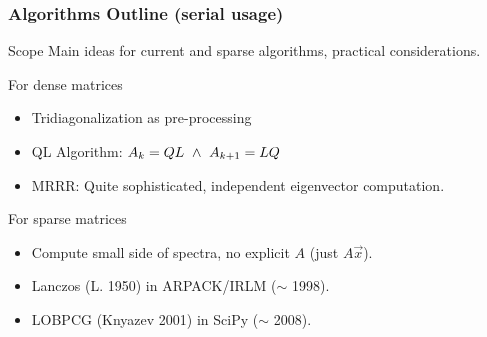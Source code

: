  \begin{frame}
  \frametitle{Algorithms Outline (serial usage)}
  \begin{block}{Scope}
    Main ideas for current and sparse algorithms, practical
    considerations. 
  \end{block}
  \begin{block}{For dense matrices}
    \begin{itemize}
      \item Tridiagonalization as pre-processing
      \item QL Algorithm: $A_k = QL \,\,\land\,\, A_{k+1} = L Q$
      \item MRRR: Quite sophisticated, independent eigenvector computation.
    \end{itemize}
  \end{block}
  \begin{block}{For sparse matrices}
    \begin{itemize}
      \item Compute small side of spectra, no explicit $A$ (just $A\vec{x}$).
    \item Lanczos (L. 1950) in ARPACK/IRLM ($\sim$ 1998).
    \item LOBPCG (Knyazev 2001) in SciPy ($\sim$ 2008).
    \end{itemize}
  \end{block}
\end{frame}
